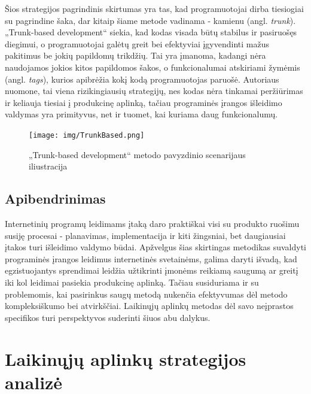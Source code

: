 \documentclass{VUMIFPSkursinis}
\begin{document}


Šios strategijos pagrindinis skirtumas yra tas, kad programuotojai dirba tiesiogiai su pagrindine šaka, dar kitaip šiame metode vadinama - kamienu (angl. \textit{trunk}). „Trunk-based development“ siekia, kad kodas visada būtų stabilus ir pasiruošęs diegimui, o programuotojai galėtų greit bei efektyviai įgyvendinti mažus pakitimus be jokių papildomų trikdžių. Tai yra įmanoma, kadangi nėra naudojamos jokios kitos papildomos šakos, o funkcionalumai atskiriami žymėmis (angl. \textit{tags}), kurios apibrėžia kokį kodą programuotojas paruošė. Autoriaus nuomone, tai viena rizikingiausių strategijų, nes kodas nėra tinkamai peržiūrimas ir keliauja tiesiai į produkcinę aplinką, tačiau programinės įrangos išleidimo valdymas yra primityvus, net ir tuomet, kai kuriama daug funkcionalumų.

\begin{figure}[H]
    \centering
    \texttt{[image: img/TrunkBased.png]}
    \caption{„Trunk-based development“ metodo pavyzdinio scenarijaus iliustracija}
    \label{img:mlp}
\end{figure}

\subsection{Apibendrinimas}
Internetinių programų leidimams įtaką daro praktiškai visi su produkto ruošimu susiję procesai - planavimas, implementacija ir kiti žingsniai, bet daugiausiai įtakos turi išleidimo valdymo būdai. Apžvelgus šias skirtingas metodikas suvaldyti programinės įrangos leidimus internetinės svetainėms, galima daryti išvadą, kad egzistuojantys sprendimai leidžia užtikrinti įmonėms reikiamą saugumą ar greitį iki kol leidimai pasiekia produkcinę aplinką. Tačiau susiduriama ir su problemomis, kai pasirinkus saugų metodą nukenčia efektyvumas dėl metodo kompleksiškumo bei atvirkščiai. Laikinųjų aplinkų metodas dėl savo neįprastos specifikos turi perspektyvos suderinti šiuos abu dalykus. 

\section{Laikinųjų aplinkų strategijos analizė}
\end{document}
